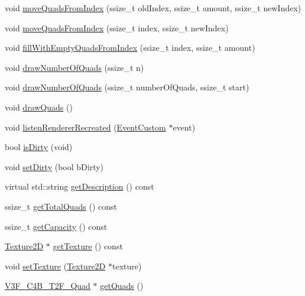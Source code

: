 \begin{DoxyCompactItemize}
\item 
void \hyperlink{classTextureAtlas_a074c3252ea542b77ae254a97917b51df}{move\+Quads\+From\+Index} (ssize\+\_\+t old\+Index, ssize\+\_\+t amount, ssize\+\_\+t new\+Index)
\item 
void \hyperlink{classTextureAtlas_aa4fb28570142da6c7a47aba59a4f021b}{move\+Quads\+From\+Index} (ssize\+\_\+t index, ssize\+\_\+t new\+Index)
\item 
void \hyperlink{classTextureAtlas_ac32f2ddd656d12d187a5ad709c74017b}{fill\+With\+Empty\+Quads\+From\+Index} (ssize\+\_\+t index, ssize\+\_\+t amount)
\item 
void \hyperlink{classTextureAtlas_af240674591a46ea07ab218b702767c5b}{draw\+Number\+Of\+Quads} (ssize\+\_\+t n)
\item 
void \hyperlink{classTextureAtlas_a991e6b2fb3bd3303a7ef27d4f82d3cdc}{draw\+Number\+Of\+Quads} (ssize\+\_\+t number\+Of\+Quads, ssize\+\_\+t start)
\item 
void \hyperlink{classTextureAtlas_a40a5702b4d87530a78f4e117088d41d6}{draw\+Quads} ()
\item 
void \hyperlink{classTextureAtlas_a1ae9b2e2ee16ce31e44171fc248f76a4}{listen\+Renderer\+Recreated} (\hyperlink{classEventCustom}{Event\+Custom} $\ast$event)
\item 
bool \hyperlink{classTextureAtlas_ac8d0af048bcd6aeafcfedf1955e7b970}{is\+Dirty} (void)
\item 
void \hyperlink{classTextureAtlas_a8a0b4fcd17e2426ad339ba2d9c4d61c2}{set\+Dirty} (bool b\+Dirty)
\item 
virtual std\+::string \hyperlink{classTextureAtlas_aa1cac3b15bf373f18fcf9a3565cd8700}{get\+Description} () const
\item 
ssize\+\_\+t \hyperlink{classTextureAtlas_a4fca29377f79ca2092e36ddd42e31313}{get\+Total\+Quads} () const
\item 
ssize\+\_\+t \hyperlink{classTextureAtlas_a36573b2d198fdf8f8bc118160408ea4b}{get\+Capacity} () const
\item 
\hyperlink{classTexture2D}{Texture2D} $\ast$ \hyperlink{classTextureAtlas_a03a776c2fefd92b7f3ed289ffe1a6254}{get\+Texture} () const
\item 
void \hyperlink{classTextureAtlas_ab55928f2095021b5f733e92e05496457}{set\+Texture} (\hyperlink{classTexture2D}{Texture2D} $\ast$texture)
\item 
\hyperlink{structV3F__C4B__T2F__Quad}{V3\+F\+\_\+\+C4\+B\+\_\+\+T2\+F\+\_\+\+Quad} $\ast$ \hyperlink{classTextureAtlas_ae6dc11457417198ddf8e1662e4b67fec}{get\+Quads} ()

\end{DoxyCompactItemize}
